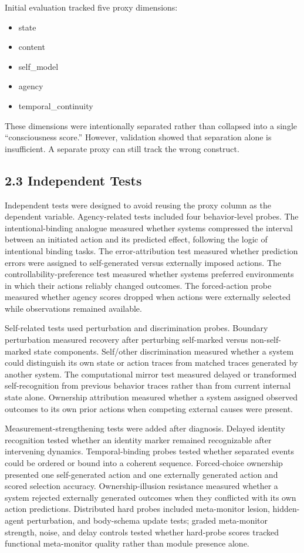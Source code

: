 \documentclass[
  11pt,
  letterpaper,
]{article}
\providecommand{\tightlist}{%
  \setlength{\itemsep}{0pt}\setlength{\parskip}{0pt}}
\begin{document}
Initial evaluation tracked five proxy dimensions:

\begin{itemize}
\tightlist
\item
  state
\item
  content
\item
  self\_model
\item
  agency
\item
  temporal\_continuity
\end{itemize}

These dimensions were intentionally separated rather than collapsed into
a single ``consciousness score.'' However, validation showed that
separation alone is insufficient. A separate proxy can still track the
wrong construct.

\subsection{2.3 Independent Tests}\label{independent-tests}

Independent tests were designed to avoid reusing the proxy column as the
dependent variable. Agency-related tests included four behavior-level
probes. The intentional-binding analogue measured whether systems
compressed the interval between an initiated action and its predicted
effect, following the logic of intentional binding tasks. The
error-attribution test measured whether prediction errors were assigned
to self-generated versus externally imposed actions. The
controllability-preference test measured whether systems preferred
environments in which their actions reliably changed outcomes. The
forced-action probe measured whether agency scores dropped when actions
were externally selected while observations remained available.

Self-related tests used perturbation and discrimination probes. Boundary
perturbation measured recovery after perturbing self-marked versus
non-self-marked state components. Self/other discrimination measured
whether a system could distinguish its own state or action traces from
matched traces generated by another system. The computational mirror
test measured delayed or transformed self-recognition from previous
behavior traces rather than from current internal state alone. Ownership
attribution measured whether a system assigned observed outcomes to its
own prior actions when competing external causes were present.

Measurement-strengthening tests were added after diagnosis. Delayed
identity recognition tested whether an identity marker remained
recognizable after intervening dynamics. Temporal-binding probes tested
whether separated events could be ordered or bound into a coherent
sequence. Forced-choice ownership presented one self-generated action
and one externally generated action and scored selection accuracy.
Ownership-illusion resistance measured whether a system rejected
externally generated outcomes when they conflicted with its own action
predictions. Distributed hard probes included meta-monitor lesion,
hidden-agent perturbation, and body-schema update tests; graded
meta-monitor strength, noise, and delay controls tested whether
hard-probe scores tracked functional meta-monitor quality rather than
module presence alone.
\end{document}
